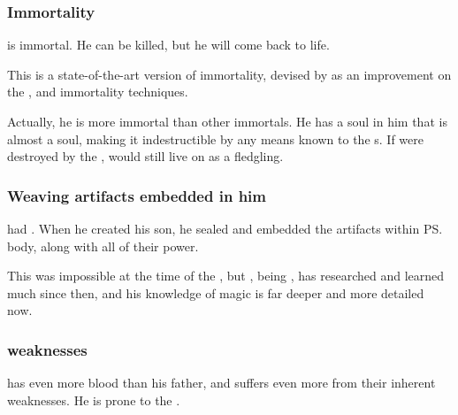 \subsubsection{Immortality}
\Vizsherioch{} is immortal. 
He can be killed, but he will come back to life. 

This is a state-of-the-art version of immortality, devised by \Secherdamon{} as an improvement on the ,  and  immortality techniques. 

Actually, he is more immortal than other immortals. 
He has a soul in him that is almost a \xsic{} soul, making it indestructible by any means known to the \Miithian s. 
If \Miith{} were destroyed by the \Voidbringer, \Vizsherioch{} would still live on as a \xs{} fledgling. 





\subsubsection{Weaving artifacts embedded in him}
\Secherdamon{} had . 
When he created his son, he sealed and embedded the artifacts within \ps{\Vizsherioch} body, along with all of their power. 

This was impossible at the time of the \SecondShrouding{}, but \Secherdamon, being , has researched and learned much since then, and his knowledge of magic is far deeper and more detailed now.





\subsubsection{\XzaiShannic{} weaknesses}
\Vizsherioch{} has even more \xsic{} blood than his father, and suffers even more from their inherent weaknesses. 
He is prone to the . 















